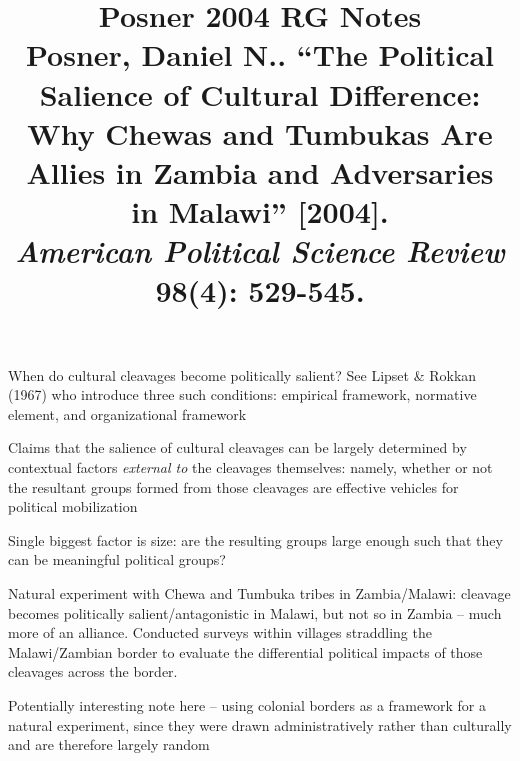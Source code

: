 \documentclass[12pt]{article}
\title{\textbf{Posner 2004 RG Notes}\\
\large Posner, Daniel N.. ``The Political Salience of Cultural Difference: Why Chewas and Tumbukas Are Allies in Zambia and Adversaries in Malawi'' [2004].\\
\textit{American Political Science Review} 98(4): 529-545.}
\author{}
\date{}
\begin{document}
\maketitle

When do cultural cleavages become politically salient? See Lipset \& Rokkan (1967) who introduce three such conditions: empirical framework, normative element, and organizational framework

Claims that the salience of cultural cleavages can be largely determined by contextual factors \textit{external to} the cleavages themselves: namely, whether or not the resultant groups formed from those cleavages are effective vehicles for political mobilization

Single biggest factor is size: are the resulting groups large enough such that they can be meaningful political groups?

Natural experiment with Chewa and Tumbuka tribes in Zambia/Malawi: cleavage becomes politically salient/antagonistic in Malawi, but not so in Zambia -- much more of an alliance. Conducted surveys within villages straddling the Malawi/Zambian border to evaluate the differential political impacts of those cleavages across the border.

Potentially interesting note here -- using colonial borders as a framework for a natural experiment, since they were drawn administratively rather than culturally and are therefore largely random
\end{document}
